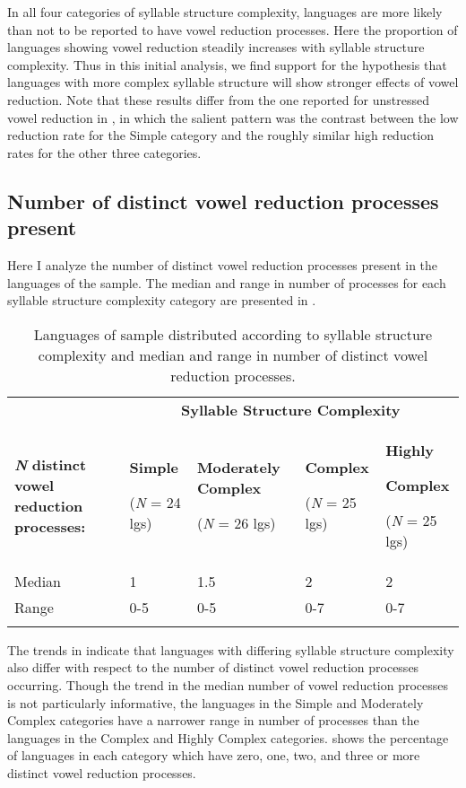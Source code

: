   In all four categories of syllable structure complexity, languages are more likely than not to be reported to have vowel reduction processes. Here the proportion of languages showing vowel reduction steadily increases with syllable structure complexity. Thus in this initial analysis, we find support for the hypothesis that languages with more complex syllable structure will show stronger effects of vowel reduction. Note that these results differ from the one reported for unstressed vowel reduction in , in which the salient pattern was the contrast between the low reduction rate for the Simple category and the roughly similar high reduction rates for the other three categories.

\subsection{Number of distinct vowel reduction processes present}\label{sec:6.3.2}

  Here I analyze the number of distinct vowel reduction processes present in the languages of the sample. The median and range in number of processes for each syllable structure complexity category are presented in .

\begin{table}
\begin{tabularx}{\textwidth}{XXXXX}
\lsptoprule
 & \multicolumn{4}{c}{ \textbf{Syllable Structure Complexity}}\\
 \textbf{\textit{N}} \textbf{distinct vowel reduction processes:} & { \textbf{Simple}}

 (\textit{N} = 24 lgs) & { \textbf{Moderately Complex}}

 (\textit{N} = 26 lgs) & { \textbf{Complex}}

 (\textit{N} = 25 lgs) & { \textbf{Highly} }

{ \textbf{Complex}}

 (\textit{N} = 25 lgs)\\
 Median & 1 & 1.5 & 2 & 2\\
 Range & 0-5 & 0-5 & 0-7 & 0-7\\
\lspbottomrule
\end{tabularx}
\caption{\label{tab:6.2}Languages of sample distributed according to syllable structure complexity and median and range in number of distinct vowel reduction processes.}
\end{table}

  The trends in  indicate that languages with differing syllable structure complexity also differ with respect to the number of distinct vowel reduction processes occurring. Though the trend in the median number of vowel reduction processes is not particularly informative, the languages in the Simple and Moderately Complex categories have a narrower range in number of processes than the languages in the Complex and Highly Complex categories.  shows the percentage of languages in each category which have zero, one, two, and three or more distinct vowel reduction processes.

